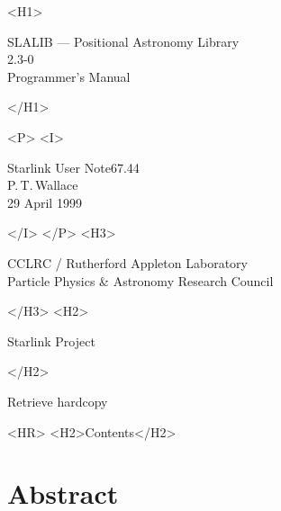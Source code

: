 \documentclass[11pt,twoside]{article}
\newcommand{\stardoccategory}  {Starlink User Note}
\newcommand{\stardocsource}    {sun67.44}
\newcommand{\stardocnumber}    {67.44}
\newcommand{\stardocauthors}   {P.\,T.\,Wallace}
\newcommand{\stardocdate}      {29 April 1999}
\newcommand{\stardoctitle}     {SLALIB --- Positional Astronomy Library}
\newcommand{\stardocversion}   {2.3-0}
\newcommand{\stardocmanual}    {Programmer's Manual}
\newcommand{\htmladdnormallink}[2]{#1}
\newcommand{\htmladdimg}[1]{}
\newcommand{\htmlref}[2]{#1}
\newcommand{\htmladdtonavigation}[1]{}
\newcommand{\xlabel}[1]{}
\newcommand{\latexonlytoc}[0]{\tableofcontents}
\begin{document}
\begin{htmlonly}
   \xlabel{}
   \begin{rawhtml} <H1> \end{rawhtml}
      \stardoctitle\\
      \stardocversion\\
      \stardocmanual
   \begin{rawhtml} </H1> \end{rawhtml}


   \begin{rawhtml} <P> <I> \end{rawhtml}
   \stardoccategory \stardocnumber \\
   \stardocauthors \\
   \stardocdate
   \begin{rawhtml} </I> </P> <H3> \end{rawhtml}
      \htmladdnormallink{CCLRC}{http://www.cclrc.ac.uk} /
      \htmladdnormallink{Rutherford Appleton Laboratory}
                        {http://www.cclrc.ac.uk/ral} \\
      \htmladdnormallink{Particle Physics \& Astronomy Research Council}
                        {http://www.pparc.ac.uk} \\
   \begin{rawhtml} </H3> <H2> \end{rawhtml}
      \htmladdnormallink{Starlink Project}{http://star-www.rl.ac.uk/}
   \begin{rawhtml} </H2> \end{rawhtml}
   \htmladdnormallink{\htmladdimg{source.gif} Retrieve hardcopy}
      {http://star-www.rl.ac.uk/cgi-bin/hcserver?\stardocsource}\\

  \label{stardoccontents}
  \begin{rawhtml}
    <HR>
    <H2>Contents</H2>
  \end{rawhtml}
  \renewcommand{\latexonlytoc}[0]{}
  \htmladdtonavigation{\htmlref{\htmladdimg{contents_motif.gif}}
        {stardoccontents}}

  \section{\xlabel{abstract}Abstract}
\end{htmlonly}
\end{document}

